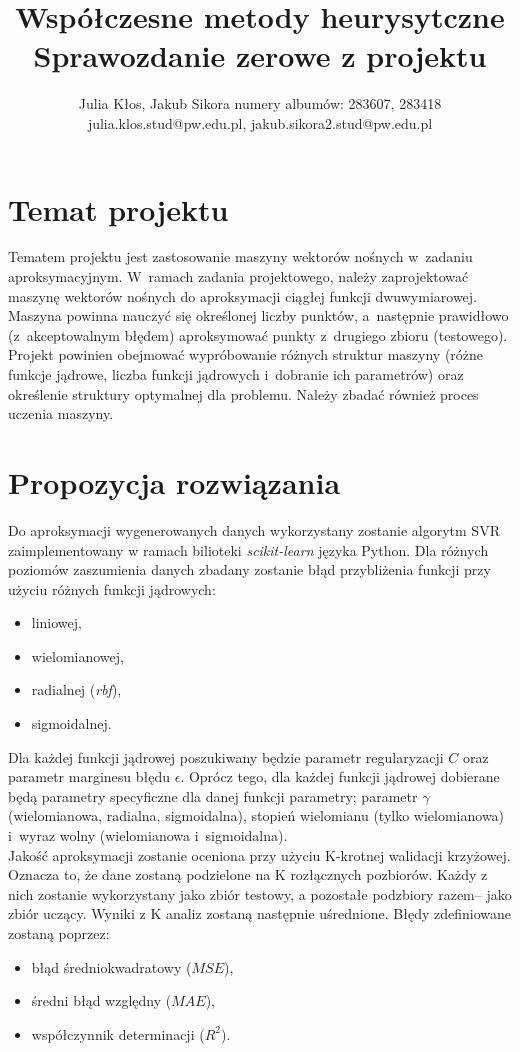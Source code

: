 \documentclass{article}
\title{Współczesne metody heurysytczne\\ Sprawozdanie zerowe z projektu}
\author{
Julia Kłos, Jakub Sikora
\affiliations
numery albumów: 283607, 283418 \\
\emails
julia.klos.stud@pw.edu.pl, jakub.sikora2.stud@pw.edu.pl
}
\begin{document}
\maketitle

\section{Temat projektu}
\label{sec:temat}
Tematem projektu jest zastosowanie maszyny wektorów nośnych w~zadaniu aproksymacyjnym. W~ramach zadania projektowego, należy zaprojektować maszynę wektorów nośnych do aproksymacji ciągłej funkcji dwuwymiarowej. Maszyna powinna nauczyć się określonej liczby punktów, a~następnie prawidłowo (z~akceptowalnym błędem) aproksymować punkty z~drugiego zbioru (testowego). Projekt powinien obejmować wypróbowanie różnych struktur maszyny (różne funkcje jądrowe, liczba funkcji jądrowych i~dobranie ich parametrów) oraz określenie struktury optymalnej dla problemu. Należy zbadać również proces uczenia maszyny.

\section{Propozycja rozwiązania}
\label{sec:rozwiazanie}
Do aproksymacji wygenerowanych danych wykorzystany zostanie algorytm SVR zaimplementowany w ramach bilioteki \textit{scikit-learn} języka Python. Dla różnych poziomów zaszumienia danych zbadany zostanie błąd przybliżenia funkcji przy użyciu różnych funkcji jądrowych:
\begin{itemize}
    \item liniowej,
    \item wielomianowej,
    \item radialnej (\textit{rbf}),
    \item sigmoidalnej.
\end{itemize}

Dla każdej funkcji jądrowej poszukiwany będzie parametr regularyzacji $C$ oraz parametr marginesu błędu $\epsilon$. Oprócz tego, dla każdej funkcji jądrowej dobierane będą parametry specyficzne dla danej funkcji parametry; parametr $\gamma$ (wielomianowa, radialna, sigmoidalna), stopień wielomianu (tylko wielomianowa) i~wyraz wolny (wielomianowa i~sigmoidalna).\\

Jakość aproksymacji zostanie oceniona przy użyciu K-krotnej walidacji krzyżowej. Oznacza to, że dane zostaną podzielone na K rozłącznych pozbiorów. Każdy z nich zostanie wykorzystany jako zbiór testowy, a pozostałe podzbiory razem-- jako zbiór uczący. Wyniki z K analiz zostaną następnie uśrednione. Błędy zdefiniowane zostaną poprzez:
\begin{itemize}
    \item błąd średniokwadratowy ($MSE$),
    \item średni błąd względny ($MAE$),
    \item współczynnik determinacji ($R^2$).
\end{itemize}
\end{document}
